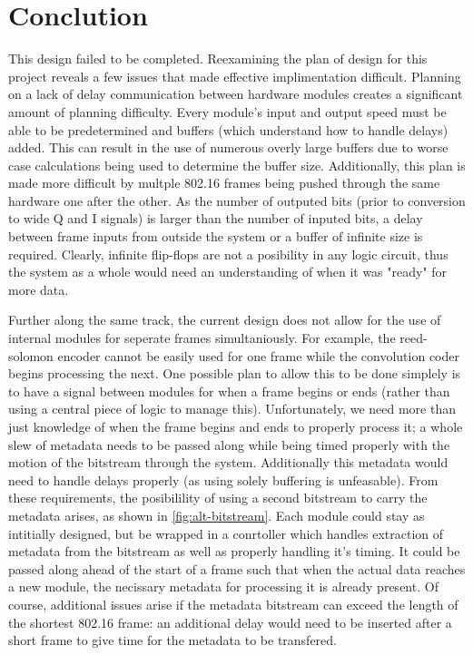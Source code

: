 \section{Conclution}

This design failed to be completed. Reexamining the plan of design for this project reveals a few issues that made effective implimentation difficult. Planning on a lack of delay communication between hardware modules creates a significant amount of planning difficulty. Every module's input and output speed must be able to be predetermined and buffers (which understand how to handle delays) added. This can result in the use of numerous overly large buffers due to worse case calculations being used to determine the buffer size. Additionally, this plan is made more difficult by multple 802.16 frames being pushed through the same hardware one after the other. As the number of outputed bits (prior to conversion to wide Q and I signals) is larger than the number of inputed bits, a delay between frame inputs from outside the system or a buffer of infinite size is required. Clearly, infinite flip-flops are not a posibility in any logic circuit, thus the system as a whole would need an understanding of when it was "ready" for more data.

Further along the same track, the current design does not allow for the use of internal modules for seperate frames simultaniously. For example, the reed-solomon encoder cannot be easily used for one frame while the convolution coder begins processing the next. One possible plan to allow this to be done simplely is to have a signal between modules for when a frame begins or ends (rather than using a central piece of logic to manage this). Unfortunately, we need more than just knowledge of when the frame begins and ends to properly process it; a whole slew of metadata needs to be passed along while being timed properly with the motion of the bitstream through the system. Additionally this metadata would need to handle delays properly (as using solely buffering is unfeasable). From these requirements, the posibilility of using a second bitstream to carry the metadata arises, as shown in \autoref{fig:alt-bitstream}. Each module could stay as intitially designed, but be wrapped in a conrtoller which handles extraction of metadata from the bitstream as well as properly handling it's timing. It could be passed along ahead of the start of a frame such that when the actual data reaches a new module, the necissary metadata for processing it is already present. Of course, additional issues arise if the metadata bitstream can exceed the length of the shortest 802.16 frame: an additional delay would need to be inserted after a short frame to give time for the metadata to be transfered.

